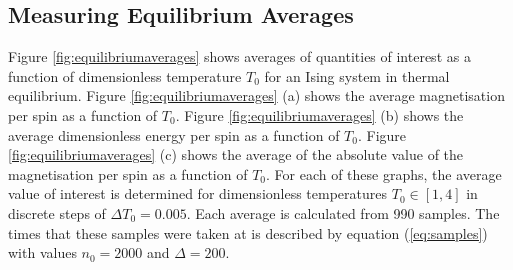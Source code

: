 \documentclass[11pt]{iopart}
\begin{document}
\subsection{Measuring Equilibrium Averages}

Figure \ref{fig:equilibriumaverages} shows averages of quantities of interest as a function of dimensionless temperature $T_0$ for an Ising system in thermal equilibrium. Figure \ref{fig:equilibriumaverages} (a) shows the average magnetisation per spin as a function of $T_0$. Figure \ref{fig:equilibriumaverages} (b) shows the average dimensionless energy per spin as a function of $T_0$. Figure \ref{fig:equilibriumaverages} (c) shows the average of the absolute value of the magnetisation per spin as a function of $T_0$. For each of these graphs, the average value of interest is determined for dimensionless temperatures $T_0 \in [1, 4]$ in discrete steps of $\Delta T_0 = 0.005$. Each average is calculated from 990 samples. The times that these samples were taken at is described by equation (\ref{eq:samples}) with values $n_0 = 2000$ and $\Delta = 200$.
\end{document}
